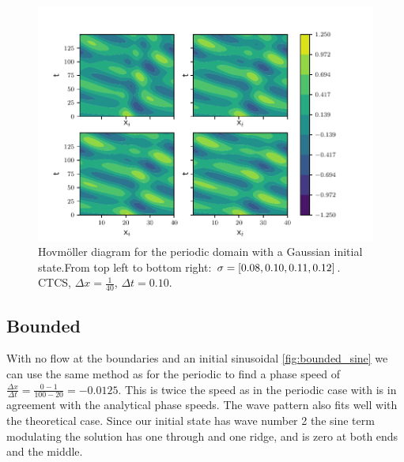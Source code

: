 \begin{figure}[H]
  \centering
  \includegraphics[width=\textwidth]{../figures/hovmuller_sigma.pdf}
  \caption{Hovmöller diagram for the periodic domain with a Gaussian initial
  state.From top left to bottom right: $\sigma = \left[0.08, 0.10, 0.11, 0.12\right]$.
  CTCS, $\Delta x = \frac{1}{40}$, $\Delta t = 0.10$.
  }
  \label{fig:periodic_gauss}
\end{figure}



\subsection{Bounded}

With no flow at the boundaries and an initial sinusoidal \cref{fig:bounded_sine}
we can use the same method as for the periodic to find a phase speed of
$\frac{\Delta x}{\Delta t} = \frac{0 -1}{100 - 20} = -0.0125$. This is twice the
speed as in the periodic case with is in agreement with the analytical phase
speeds. The wave pattern also fits well with the theoretical case. Since our
initial state has wave number 2 the sine term modulating the solution has one
through and one ridge, and is zero at both ends and the middle.


